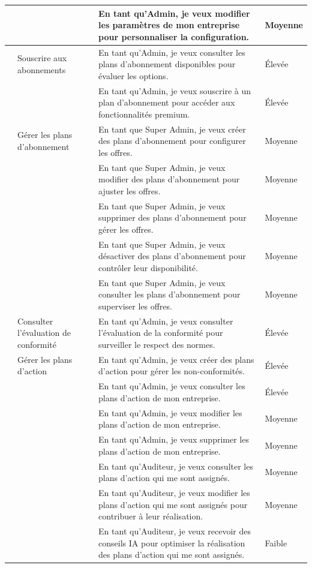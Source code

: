 \begin{longtable}{|>{\raggedright\arraybackslash}p{0.5cm}|>{\raggedright\arraybackslash}p{3cm}|>{\raggedright\arraybackslash}p{8cm}|>{\raggedright\arraybackslash}p{2cm}|}
\cline{3-4}
& & En tant qu'Admin, je veux modifier les paramètres de mon entreprise pour personnaliser la configuration. & Moyenne \\
\hline
13 & Souscrire aux abonnements & En tant qu'Admin, je veux consulter les plans d'abonnement disponibles pour évaluer les options. & Élevée \\
\cline{3-4}
& & En tant qu'Admin, je veux souscrire à un plan d'abonnement pour accéder aux fonctionnalités premium. & Élevée \\
\hline
14 & Gérer les plans d'abonnement & En tant que Super Admin, je veux créer des plans d'abonnement pour configurer les offres. & Moyenne \\
\cline{3-4}
& & En tant que Super Admin, je veux modifier des plans d'abonnement pour ajuster les offres. & Moyenne \\
\cline{3-4}
& & En tant que Super Admin, je veux supprimer des plans d'abonnement pour gérer les offres. & Moyenne \\
\cline{3-4}
& & En tant que Super Admin, je veux désactiver des plans d'abonnement pour contrôler leur disponibilité. & Moyenne \\
\cline{3-4}
& & En tant que Super Admin, je veux consulter les plans d'abonnement pour superviser les offres. & Moyenne \\
\hline
15 & Consulter l'évaluation de conformité & En tant qu'Admin, je veux consulter l'évaluation de la conformité pour surveiller le respect des normes. & Élevée \\
\hline
16 & Gérer les plans d’action & En tant qu'Admin, je veux créer des plans d'action pour gérer les non-conformités. & Élevée \\
\cline{3-4}
& & En tant qu'Admin, je veux consulter les plans d'action de mon entreprise. & Élevée \\
\cline{3-4}
& & En tant qu'Admin, je veux modifier les plans d'action de mon entreprise. & Moyenne \\
\cline{3-4}
& & En tant qu'Admin, je veux supprimer les plans d'action de mon entreprise. & Moyenne \\
\cline{3-4}
& & En tant qu'Auditeur, je veux consulter les plans d'action qui me sont assignés. & Moyenne \\
\cline{3-4}
& & En tant qu'Auditeur, je veux modifier les plans d'action qui me sont assignés pour contribuer à leur réalisation. & Moyenne \\
\cline{3-4}
& & En tant qu'Auditeur, je veux recevoir des conseils IA pour optimiser la réalisation des plans d'action qui me sont assignés. & Faible \\

\end{longtable}
